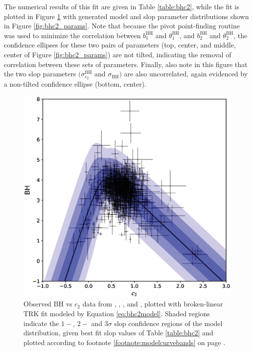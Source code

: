 The numerical results of this fit are given in Table \ref{table:bhc2}, while the fit is plotted in Figure \ref{fig:bhc2_data} with generated model and slop parameter distributions shown in Figure \ref{fig:bhc2_params}. Note that because the pivot point-finding routine was used to minimize the correlation between $b_1^{\text{BH}}$ and $\theta_1^{\text{BH}}$, and $b_2^{\text{BH}}$ and $\theta_2^{\text{BH}}$, the confidence ellipses for these two pairs of parameters (top, center, and middle, center of Figure \ref{fig:bhc2_params}) are not tilted, indicating the removal of correlation between these sets of parameters. Finally, also note in this figure that the two slop parameters $(\sigma_{c_2}^{\text{BH}}$ and $\sigma_{\text{BH}})$ are also uncorrelated, again evidenced by a non-tilted confidence ellipse (bottom, center).

\begin{figure}
    \centering
    \includegraphics[width=1.0\linewidth]{figures/bhc2_data.eps}
    \caption{Observed $\text{BH}$ vs $c_2$ data from \textcite{valencic04}, \textcite{gordon03}, \textcite{newdatafitzpatrick2007analysis}, and \textcite{m31dataclayton2015new}, plotted with broken-linear TRK fit modeled by Equation \eqref{eq:bhc2model}. Shaded regions indicate the $1-$, $2-$ and $3\sigma$ slop confidence regions of the model distribution, given best fit slop values of Table \ref{table:bhc2} and plotted according to footnote \ref{footnote:modelcurvebands} on page \pageref{footnote:modelcurvebands}.}
    \label{fig:bhc2_data}
\end{figure}


